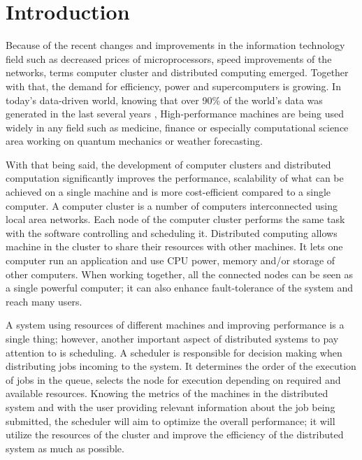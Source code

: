 \documentclass[10pt]{report}
\begin{document}

\tableofcontents

\newpage
\chapter{Introduction} \label{chap1}

Because of the recent changes and improvements in the information technology field such as decreased prices of microprocessors, speed improvements of the networks, terms computer cluster and distributed computing emerged. Together with that, the demand for efficiency, power and supercomputers is growing. In today's data-driven world, knowing that over 90\% of the world's data was generated in the last several years \cite{bigdataweb}, High-performance machines are being used widely in any field such as medicine, finance or especially computational science area working on quantum mechanics or weather forecasting.
\newline

With that being said, the development of computer clusters and distributed computation significantly improves the performance, scalability of what can be achieved on a single machine and is more cost-efficient compared to a single computer. A computer cluster is a number of computers interconnected using local area networks. Each node of the computer cluster performs the same task with the software controlling and scheduling it. Distributed computing allows machine in the cluster to share their resources with other machines. It lets one computer run an application and use CPU power, memory and/or storage of other computers. When working together, all the connected nodes can be seen as a single powerful computer; it can also enhance fault-tolerance of the system and reach many users.
\newline

A system using resources of different machines and improving performance is a single thing; however, another important aspect of distributed systems to pay attention to is scheduling. A scheduler is responsible for decision making when distributing jobs incoming to the system. It determines the order of the execution of jobs in the queue, selects the node for execution depending on required and available resources. Knowing the metrics of the machines in the distributed system and with the user providing relevant information about the job being submitted, the scheduler will aim to optimize the overall performance; it will utilize the resources of the cluster and improve the efficiency of the distributed system as much as possible.
\end{document}
